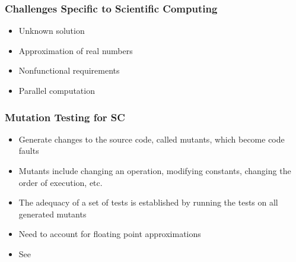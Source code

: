\documentclass[t,12pt,numbers,fleqn]{beamer}
\begin{document}



\begin{frame}
\frametitle{Challenges Specific to Scientific Computing}
\begin{itemize}
\item Unknown solution
\item Approximation of real numbers
\item Nonfunctional requirements
\item Parallel computation
\end{itemize}
\end{frame}


\begin{frame}
\frametitle{Mutation Testing for SC}
\begin{itemize}
\item Generate changes to the source code, called mutants, which become code faults
\item Mutants include changing an operation, modifying constants, changing the order of execution, etc.
\item The adequacy of a set of tests is established by running the tests on all generated mutants
\item Need to account for floating point approximations
\item See \cite{HookAndKelly2009}
\end{itemize}
\end{frame}
\end{document}
